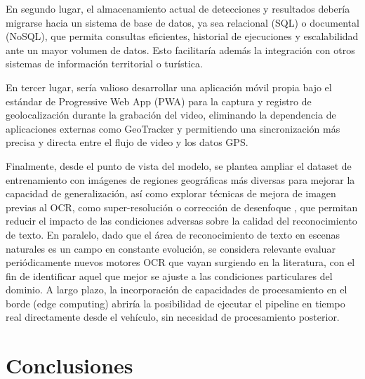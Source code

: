 \documentclass[runningheads]{llncs}
\begin{document}
En segundo lugar, el almacenamiento actual de detecciones y resultados 
debería migrarse hacia un sistema de base de datos, ya sea 
relacional (SQL) o documental (NoSQL), que permita consultas eficientes, 
historial de ejecuciones y escalabilidad ante un mayor volumen de datos.
Esto facilitaría además la integración con otros sistemas de información 
territorial o turística.

En tercer lugar, sería valioso desarrollar una aplicación móvil propia 
bajo el estándar de Progressive Web App (PWA) para la captura y 
registro de geolocalización durante la grabación del video, 
eliminando la dependencia de aplicaciones externas como GeoTracker 
y permitiendo una sincronización más precisa y directa entre el 
flujo de video y los datos GPS.

Finalmente, desde el punto de vista del modelo, se plantea ampliar el 
dataset de entrenamiento con imágenes de regiones geográficas más diversas
para mejorar la capacidad de generalización, así como explorar técnicas 
de mejora de imagen previas al OCR, como super-resolución \cite{ultralytics_super_resolution}
o corrección de desenfoque \cite{correcion-desenfoque}, que permitan reducir el impacto de las condiciones 
adversas sobre la calidad del reconocimiento de texto. En paralelo, 
dado que el área de reconocimiento de texto en escenas naturales es un 
campo en constante evolución, se considera relevante evaluar 
periódicamente nuevos motores OCR que vayan surgiendo en la literatura, 
con el fin de identificar aquel que mejor se ajuste a las condiciones 
particulares del dominio. A largo plazo, la incorporación de capacidades 
de procesamiento en el borde (edge computing) abriría la posibilidad de 
ejecutar el pipeline en tiempo real directamente desde el vehículo, 
sin necesidad de procesamiento posterior.
\section{Conclusiones}
\end{document}
